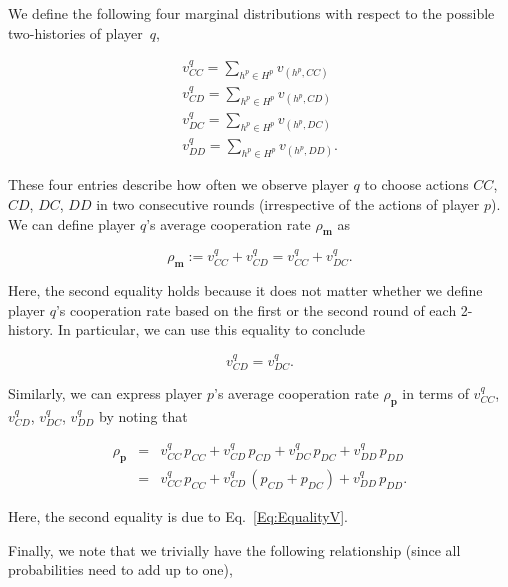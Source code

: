 \documentclass{article}
\theoremstyle{definition}
\begin{document}
We define the following four marginal distributions with respect to the possible two-histories of player~$q$,

\begin{equation}
\begin{array}{l}
\displaystyle v^q_{CC} = \sum_{h^p\in H^p} v_{(h^p,CC)}\\
\displaystyle v^q_{CD} = \sum_{h^p\in H^p} v_{(h^p,CD)}\\
\displaystyle v^q_{DC} = \sum_{h^p\in H^p} v_{(h^p,DC)}\\
\displaystyle v^q_{DD} = \sum_{h^p\in H^p} v_{(h^p,DD)}.
\end{array}
\end{equation}

These four entries describe how often we observe player $q$ to choose actions
$CC$, $CD$, $DC$, $DD$ in two consecutive rounds (irrespective of the actions of
player $p$). We can define player $q$'s average cooperation rate $\rho_\mathbf{m}$ as 

\begin{equation} \label{Eq:rhoq_n2}
\rho_\mathbf{m} := v^q_{CC} + v^q_{CD} = v^q_{CC} + v^q_{DC}.
\end{equation}

Here, the second equality holds because it does not matter whether we define
player $q$'s cooperation rate based on the first or the second round of each
2-history. In particular, we can use this equality to conclude

\begin{equation} \label{Eq:EqualityV}
v^q_{CD} = v^q_{DC}.
\end{equation}

Similarly, we can express player $p$'s average cooperation rate
$\rho_\mathbf{p}$ in terms of $v^q_{CC}$, $v^q_{CD}$, $v^q_{DC}$, $v^q_{DD}$ by
noting that

\begin{equation} \label{Eq:rhop_n2}
\begin{array}{lll}
\rho_\mathbf{p} &= &\displaystyle v^q_{CC}\, p_{CC} +  v^q_{CD}\,p_{CD} + v^q_{DC}\, p_{DC} + v^q_{DD}\, p_{DD}\\[0.2cm]
	& =  &v^q_{CC}\, p_{CC} +  v^q_{CD}\,(p_{CD}\!+\!p_{DC}) + v^q_{DD}\, p_{DD}.
\end{array}
\end{equation}

Here, the second equality is due to Eq.~\eqref{Eq:EqualityV}.

Finally, we note that we trivially have the following relationship (since all probabilities need to add up to one),
\end{document}
